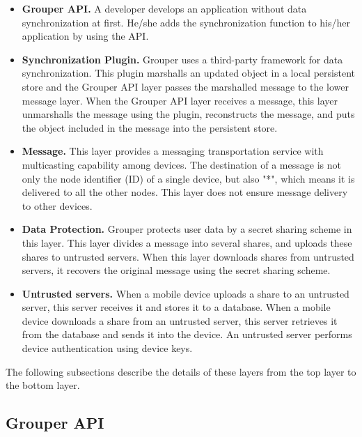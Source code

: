 \documentclass[sigconf]{acmart}
\begin{document}
\begin{itemize}
	\setlength{\itemsep}{1pt}
	\setlength{\parskip}{0pt}
	\setlength{\parsep}{0pt}
	\item \textbf{Grouper API.}
	A developer develops an application without data synchronization at first. 
	He/she adds the synchronization function to his/her application by using the API.
	\item \textbf{Synchronization Plugin.} 
	Grouper uses a third-party framework for data synchronization.
	This plugin marshalls an updated object in a local persistent store and the Grouper API layer passes the marshalled message to the lower message layer.
	When the Grouper API layer receives a message, this layer unmarshalls the message using the plugin, reconstructs the message, and puts the object included in the message into the persistent store.
	\item \textbf{Message.}
	This layer provides a messaging transportation service with multicasting capability among devices.
	The destination of a message is not only the node identifier (ID) of a single device, but also "*", which means it is delivered to all the other nodes.
	This layer does not ensure message delivery to other devices.
	\item \textbf{Data Protection.}
	Grouper protects user data by a secret sharing scheme in this layer.
	This layer divides a message into several shares, and uploads these shares to untrusted servers.
	When this layer downloads shares from untrusted servers, it recovers the original message using the secret sharing scheme.
	\item \textbf{Untrusted servers.}
	When a mobile device uploads a share to an untrusted server, this server receives it and stores it to a database.
	When a mobile device downloads a share from an untrusted server, this server retrieves it from the database and sends it into the device.
	An untrusted server performs device authentication using device keys.
\end{itemize}

The following subsections describe the details of these layers from the top layer to the bottom layer.

\subsection{Grouper API}
\end{document}
